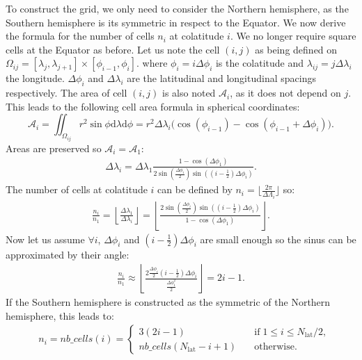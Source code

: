 To construct the grid, we only need to consider the Northern hemisphere, as the
Southern hemisphere is its symmetric in respect to the Equator.  We now derive
the formula for the number of cells $n_i$ at colatitude $i$. We no longer
require square cells at the Equator as before. Let us note the cell $(i,j)$ as
being defined on 
$\Omega_{ij} = [\lambda_j, \lambda_{j+1}]\times [\phi_{i-1},\phi_i]$. 
where $\phi_i=i\Delta\phi_i$ is the colatitude and
$\lambda_{ij}=j\Delta\lambda_i$ the longitude.
$\Delta\phi_i$ and $\Delta\lambda_i$ are the latitudinal and
longitudinal spacings respectively.
The area of cell $(i,j)$ is also noted $\mathcal{A}_{i}$, as it does not
depend on $j$. This leads to the following cell area formula in spherical
coordinates:
\begin{equation}
  \mathcal{A}_{i} = \iint_{\Omega_{ij}}  r^2 \sin\phi 
  \mathrm{d}\lambda \mathrm{d}\phi \nonumber
  = r^2 \Delta\lambda_i \big (\cos(\phi_{i-1}) - \cos(\phi_{i-1}+\Delta\phi_i)\big).
\label{eqn:cell_area}
\end{equation}
Areas are preserved so $\mathcal{A}_i=\mathcal{A}_1$:
\begin{align*} \Delta\lambda_i  = \Delta\lambda_1 \frac {1-\cos(\Delta\phi_1)}
  {2\sin\left( \frac{\Delta\phi_i}{2} \right) \sin\left(\left(i-\frac{1}{2}\right)\Delta\phi_i\right)}.
\end{align*}
The number of cells at colatitude $i$ can be defined by
$n_i = \lfloor \frac{2\pi}{\Delta\Lambda_i}\rfloor$ so:
\begin{align*} \frac{n_i}{n_1} = \left\lfloor \frac{\Delta\lambda_1}{\Delta\lambda_i} \right\rfloor=
  \left\lfloor \frac {2\sin\left( \frac{\Delta\phi_i}{2} \right) \sin\left(\left(i-\frac{1}{2}\right)\Delta\phi_i\right)}%
  {1-\cos(\Delta\phi_1)}\right\rfloor.
\end{align*}
Now let us assume $\forall i$, $\Delta\phi_i$ and
$(i-\frac{1}{2})\Delta\phi_i$ are small enough so the sinus can be approximated
by their angle:
\begin{align*} \frac{n_i}{n_1} \approx
  \left\lfloor \frac{2  \frac{\Delta\phi_i}{2}  \left(i-\frac{1}{2}\right) \Delta\phi_i}%
  {\frac{\Delta\phi_1^2}{2}} \right\rfloor
  = 2i-1.
\end{align*}
If the Southern hemisphere is constructed as the symmetric of the Northern
hemisphere, this leads to:
\begin{align}
  &n_i = nb\_cells(i) =
  \begin{cases}
    3(2i-1) & \quad \text{if} \; 1 \le i \le N_{\text{lat}}/2, \\
    nb\_cells(N_\mathrm{lat}-i+1) & \quad \text{otherwise.}
  \end{cases}
\label{eqn:nb_cells}
\end{align}
